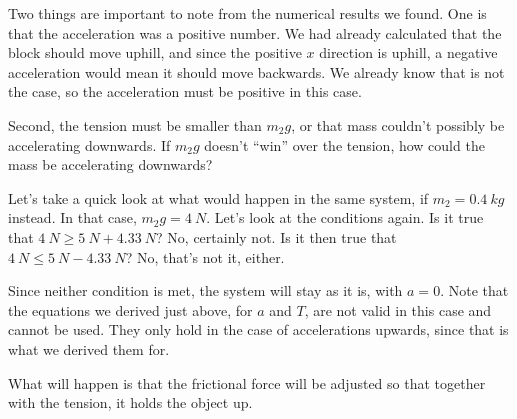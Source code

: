 Two things are important to note from the numerical results we found. One is that the acceleration was a positive number. We had already calculated that the block should move uphill, and since the positive $x$ direction is uphill, a negative acceleration would mean it should move backwards. We already know that is not the case, so the acceleration must be positive in this case.

Second, the tension must be smaller than $m_2 g$, or that mass couldn't possibly be accelerating downwards. If $m_2 g$ doesn't ``win'' over the tension, how could the mass be accelerating downwards?

Let's take a quick look at what would happen in the same system, if $m_2 = \SI{0.4}{kg}$ instead. In that case, $m_2 g = \SI{4}{N}$. Let's look at the conditions again. Is it true that $\SI{4}{N} \ge \SI{5}{N} + \SI{4.33}{N}$? No, certainly not. Is it then true that $\SI{4}{N} \le \SI{5}{N} - \SI{4.33}{N}$? No, that's not it, either.

Since neither condition is met, the system will stay as it is, with $a = 0$. Note that the equations we derived just above, for $a$ and $T$, are not valid in this case and cannot be used. They only hold in the case of accelerations upwards, since that is what we derived them for.

What will happen is that the frictional force will be adjusted so that together with the tension, it holds the object up.

